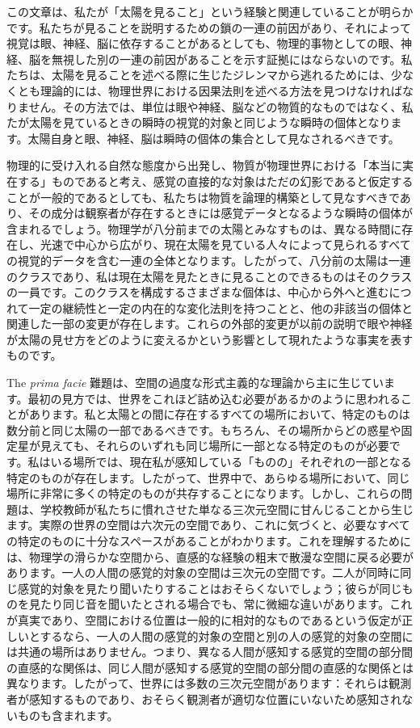 \documentclass[a4paper,11pt,openany]{ltjsbook}
\begin{document}
この文章は、私たが「太陽を見ること」という経験と関連していることが明らかです。私たちが見ることを説明するための鎖の一連の前因があり、それによって視覚は眼、神経、脳に依存することがあるとしても、物理的事物としての眼、神経、脳を無視した別の一連の前因があることを示す証拠にはならないのです。私たちは、太陽を見ることを述べる際に生じたジレンマから逃れるためには、少なくとも理論的には、物理世界における因果法則を述べる方法を見つけなければなりません。その方法では、単位は眼や神経、脳などの物質的なものではなく、私たが太陽を見ているときの瞬時の視覚的対象と同じような瞬時の個体となります。太陽自身と眼、神経、脳は瞬時の個体の集合として見なされるべきです。

物理的に受け入れる自然な態度から出発し、物質が物理世界における「本当に実在する」ものであると考え、感覚の直接的な対象はただの幻影であると仮定することが一般的であるとしても、私たちは物質を論理的構築として見なすべきであり、その成分は観察者が存在するときには感覚データとなるような瞬時の個体が含まれるでしょう。物理学が八分前までの太陽とみなすものは、異なる時間に存在し、光速で中心から広がり、現在太陽を見ている人々によって見られるすべての視覚的データを含む一連の全体となります。したがって、八分前の太陽は一連のクラスであり、私は現在太陽を見たときに見ることのできるものはそのクラスの一員です。このクラスを構成するさまざまな個体は、中心から外へと進むにつれて一定の継続性と一定の内在的な変化法則を持つことと、他の非該当の個体と関連した一部の変更が存在します。これらの外部的変更が以前の説明で眼や神経が太陽の見せ方をどのように変えるかという影響として現れたような事実を表すものです。

The \textit{prima facie} 難題は、空間の過度な形式主義的な理論から主に生じています。最初の見方では、世界をこれほど詰め込む必要があるかのように思われることがあります。私と太陽との間に存在するすべての場所において、特定のものは数分前と同じ太陽の一部であるべきです。もちろん、その場所からどの惑星や固定星が見えても、それらのいずれも同じ場所に一部となる特定のものが必要です。私はいる場所では、現在私が感知している「ものの」それぞれの一部となる特定のものが存在します。したがって、世界中で、あらゆる場所において、同じ場所に非常に多くの特定のものが共存することになります。しかし、これらの問題は、学校教師が私たちに慣れさせた単なる三次元空間に甘んじることから生じます。実際の世界の空間は六次元の空間であり、これに気づくと、必要なすべての特定のものに十分なスペースがあることがわかります。これを理解するためには、物理学の滑らかな空間から、直感的な経験の粗末で散漫な空間に戻る必要があります。一人の人間の感覚的対象の空間は三次元の空間です。二人が同時に同じ感覚的対象を見たり聞いたりすることはおそらくないでしょう；彼らが同じものを見たり同じ音を聞いたとされる場合でも、常に微細な違いがあります。これが真実であり、空間における位置は一般的に相対的なものであるという仮定が正しいとするなら、一人の人間の感覚的対象の空間と別の人の感覚的対象の空間には共通の場所はありません。つまり、異なる人間が感知する感覚的空間の部分間の直感的な関係は、同じ人間が感知する感覚的空間の部分間の直感的な関係とは異なります。したがって、世界には多数の三次元空間があります：それらは観測者が感知するものであり、おそらく観測者が適切な位置にいないため感知されないものも含まれます。
\end{document}
